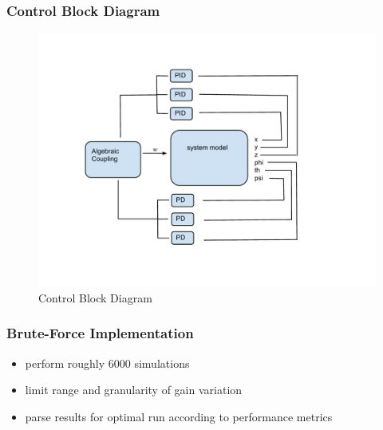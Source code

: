 \documentclass{beamer}
\begin{document}
\begin{frame}
\frametitle{Control Block Diagram}

\begin{figure}[htbp]
  \centering
    \includegraphics[width=\textwidth]{Figures/block_diagram.pdf}
  \caption[blockdiagram]{Control Block Diagram}
  \label{fig:block diagram}
\end{figure}
\end{frame}


\begin{frame}
\frametitle{Brute-Force Implementation}

\begin{itemize}
\item perform roughly 6000 simulations
\item limit range and granularity of gain variation
\item parse results for optimal run according to performance metrics
\end{itemize}

\end{frame}
\end{document}
